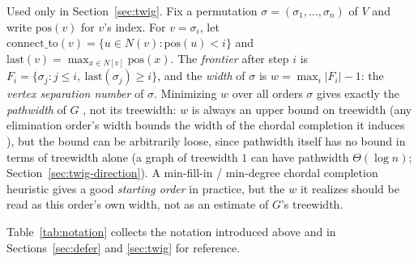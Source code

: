 \documentclass[ASNA,number]{USG}
\begin{document}
Used only in Section~\ref{sec:twig}. Fix a
permutation $\sigma=(\sigma_1,\dots,\sigma_n)$ of $V$ and write
$\mathrm{pos}(v)$ for $v$'s index. For $v=\sigma_i$, let
$\mathrm{connect\_to}(v)=\{u\in N(v):\mathrm{pos}(u)<i\}$ and
$\mathrm{last}(v)=\max_{x\in N[v]}\mathrm{pos}(x)$. The \emph{frontier}
after step $i$ is $F_i=\{\sigma_j:j\le i,\ \mathrm{last}(\sigma_j)\ge i\}$,
and the \emph{width} of $\sigma$ is $w=\max_i|F_i|-1$: the \emph{vertex
separation number} of $\sigma$. Minimizing $w$ over all orders $\sigma$
gives exactly the \emph{pathwidth} of $G$ \citep{kinnersley1992}, not its
treewidth: $w$ is always an upper bound on treewidth (any elimination
order's width bounds the width of the chordal completion it induces
\citep{bodlaender1988,cygan2015}), but the bound can be arbitrarily loose,
since pathwidth itself has no bound in terms of treewidth alone (a graph
of treewidth $1$ can have pathwidth $\Theta(\log n)$;
Section~\ref{sec:twig-direction}). A min-fill-in / min-degree chordal
completion heuristic \citep{bodlaender1988,cygan2015} gives a good
\emph{starting order} in practice, but the $w$ it realizes should be read
as this order's own width, not as an estimate of $G$'s treewidth.

Table~\ref{tab:notation} collects the notation introduced above and in
Sections~\ref{sec:defer} and \ref{sec:twig} for reference.
\end{document}
